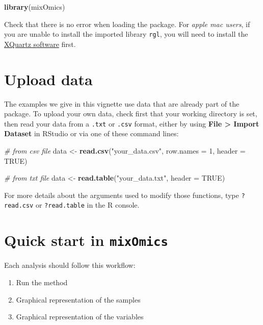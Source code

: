 \documentclass[]{book}
\newenvironment{Shaded}{\begin{snugshade}}{\end{snugshade}}
\newcommand{\KeywordTok}[1]{\textcolor[rgb]{0.13,0.29,0.53}{\textbf{#1}}}
\newcommand{\DataTypeTok}[1]{\textcolor[rgb]{0.13,0.29,0.53}{#1}}
\newcommand{\DecValTok}[1]{\textcolor[rgb]{0.00,0.00,0.81}{#1}}
\newcommand{\StringTok}[1]{\textcolor[rgb]{0.31,0.60,0.02}{#1}}
\newcommand{\CommentTok}[1]{\textcolor[rgb]{0.56,0.35,0.01}{\textit{#1}}}
\newcommand{\OtherTok}[1]{\textcolor[rgb]{0.56,0.35,0.01}{#1}}
\newcommand{\NormalTok}[1]{#1}
\providecommand{\tightlist}{%
  \setlength{\itemsep}{0pt}\setlength{\parskip}{0pt}}
\theoremstyle{definition}
\theoremstyle{definition}
\theoremstyle{definition}
\theoremstyle{remark}
\begin{document}
\begin{Shaded}
\begin{Highlighting}[]
\KeywordTok{library}\NormalTok{(mixOmics)}
\end{Highlighting}
\end{Shaded}

Check that there is no error when loading the package. For \emph{apple
mac users}, if you are unable to install the imported library
\texttt{rgl}, you will need to install the
\href{https://www.xquartz.org}{XQuartz software} first.

\section{Upload data}\label{upload-data}

The examples we give in this vignette use data that are already part of
the package. To upload your own data, check first that your working
directory is set, then read your data from a \texttt{.txt} or
\texttt{.csv} format, either by using \textbf{File \textgreater{} Import
Dataset} in RStudio or via one of these command lines:

\begin{Shaded}
\begin{Highlighting}[]
\CommentTok{# from csv file}
\NormalTok{data <-}\StringTok{ }\KeywordTok{read.csv}\NormalTok{(}\StringTok{"your_data.csv"}\NormalTok{, }\DataTypeTok{row.names =} \DecValTok{1}\NormalTok{, }\DataTypeTok{header =} \OtherTok{TRUE}\NormalTok{)}

\CommentTok{# from txt file}
\NormalTok{data <-}\StringTok{ }\KeywordTok{read.table}\NormalTok{(}\StringTok{"your_data.txt"}\NormalTok{, }\DataTypeTok{header =} \OtherTok{TRUE}\NormalTok{)}
\end{Highlighting}
\end{Shaded}

For more details about the arguments used to modify those functions,
type \texttt{?read.csv} or \texttt{?read.table} in the R console.

\section{\texorpdfstring{Quick start in
\texttt{mixOmics}}{Quick start in mixOmics}}\label{start:PCA}

Each analysis should follow this workflow:

\begin{enumerate}
\def\labelenumi{\arabic{enumi}.}
\tightlist
\item
  Run the method
\item
  Graphical representation of the samples
\item
  Graphical representation of the variables
\end{enumerate}
\end{document}

